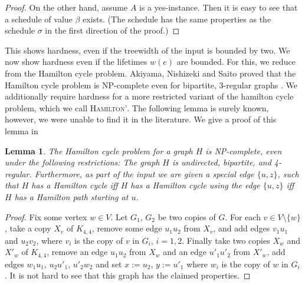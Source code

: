 \documentclass[10pt,a4paper]{article}
\newtheorem{lemma}[theorem]{Lemma}
\numberwithin{equation}{section}
\newcommand{\set}[1]{\{ #1 \}}
\newcommand{\act}{\textsc{(Act)}}
\begin{document}
\begin{proof}
On the other hand, assume $A$ is a yes-instance. Then it is easy to see that a schedule of value $\beta$ exists. (The schedule has the same properties as the schedule $\sigma$ in the first direction of the proof.)
\end{proof}

This shows hardness, even if the treewidth of the input is bounded by two. We now show hardness even if the lifetimes $w(e)$ are bounded. For this, we reduce from the Hamilton cycle problem. Akiyama, Nishizeki and Saito proved that the Hamilton cycle problem is NP-complete even for bipartite, 3-regular graphs \cite{hamilton3regularBip}. We additionally require hardness for a more restricted variant of the hamilton cycle problem, which we call \textsc{Hamilton'}. The following lemma is surely known, however, we were unable to find it in the literature. We give a proof of this lemma in 

\begin{lemma}
\label{hamilton_cycle_lemma}
The Hamilton cycle problem for a graph $H$ is NP-complete, even under the following restrictions: The graph $H$ is undirected, bipartite, and 4-regular. Furthermore, as part of the input we are given a special edge $\set{u, z}$, such that $H$ has a Hamilton cycle iff $H$ has a Hamilton cycle using the edge $\set{u, z}$ iff $H$ has a Hamilton path starting at $u$.
\end{lemma} 

\begin{proof}
Fix some vertex $w \in V$. Let $G_1$, $G_2$ be two copies of $G$. For each $v \in V \setminus \set{w}$, take a copy $X_v$ of $K_{4,4}$, remove some edge $u_1u_2$ from $X_v$, and add edges $v_1u_1$ and $u_2v_2$, where $v_i$ is the copy of $v$ in $G_i$, $i = 1,2$. Finally take two copies $X_w$ and $X'_w$ of $K_{4,4}$, remove an edge ${u_1u_2}$ from $X_w$ and an edge $u'_1u'_2$ from $X'_w$, add edges $w_1u_1$, $u_2u'_1$, $u'_2w_2$ and set $x := u_2$, $y := u'_1$ where $w_i$ is the copy of $w$ in $G_i$. It is not hard to see that this graph has the claimed properties.
\end{proof}
\end{document}
